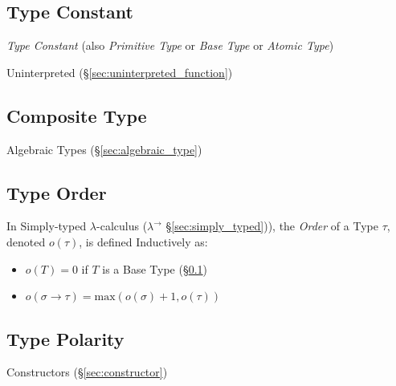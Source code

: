 \subsection{Type Constant}\label{sec:type_constant}

\emph{Type Constant} (also \emph{Primitive Type} or \emph{Base Type}
or \emph{Atomic Type})

Uninterpreted (\S\ref{sec:uninterpreted_function}) %



\subsection{Composite Type}\label{sec:composite_type}

Algebraic Types (\S\ref{sec:algebraic_type})



\subsection{Type Order}\label{sec:type_order}

In Simply-typed $\lambda$-calculus ($\lambda^\rightarrow$
\S\ref{sec:simply_typed})), the \emph{Order} of a Type $\tau$, denoted
$o(\tau)$, is defined Inductively as:
\begin{itemize}
\item $o(T) = 0$ if $T$ is a Base Type (\S\ref{sec:type_constant})
\item $o(\sigma \rightarrow \tau) = \text{max}(o(\sigma) + 1,
  o(\tau))$
\end{itemize}



\subsection{Type Polarity}\label{sec:type_polarity}

Constructors (\S\ref{sec:constructor})

